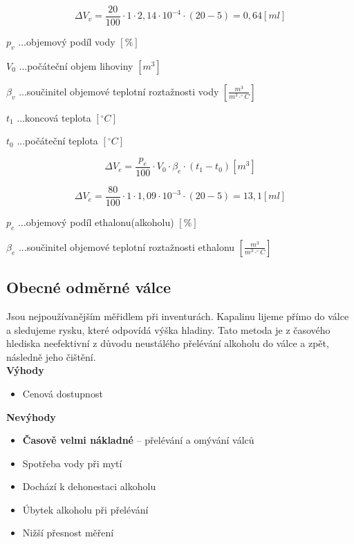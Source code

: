 \[\Delta V_v = \frac{20}{100} \cdot 1 \cdot  2,14 \cdot 10^{-4} \cdot (20 - 5) = 0,64 \left[ml\right]\]

\(p_v\) ...objemový podíl vody \([\%]\) 

\(V_0\) ...počáteční objem lihoviny \([m^3]\)

\(\beta_v\) ...součinitel objemové teplotní roztažnosti vody \([\frac{m^3}{m^3 \cdot ^\circ C}]\)

\(t_1\) ...koncová teplota \([^\circ C]\)

\(t_0\) ...počáteční teplota \([^\circ C]\)

\begin{equation}
    \Delta V_e = \frac{p_e}{100} \cdot V_0 \cdot \beta_e \cdot (t_1 - t_0)\left[m^3\right] \label{objem_kapalina}
\end{equation}

\[\Delta V_e = \frac{80}{100} \cdot 1 \cdot  1,09 \cdot 10^{-3} \cdot (20 - 5) = 13,1 \left[ml\right]\]

\(p_e\) ...objemový podíl ethalonu(alkoholu) \([\%]\) 

\(\beta_e\) ...součinitel objemové teplotní roztažnosti ethalonu \([\frac{m^3}{m^3 \cdot ^\circ C}]\)


\subsection{Obecné odměrné válce}
\label{obecny_valec}

Jsou nejpoužívanějším měřidlem při inventurách. Kapalinu lijeme přímo do válce a sledujeme rysku, které odpovídá výška hladiny. Tato metoda je z časového hlediska neefektivní z důvodu neustálého přelévání alkoholu do válce a zpět, následně jeho čištění.\\

\textbf{Výhody}
\begin{itemize}
    \item Cenová dostupnost\\
\end{itemize}

\textbf{Nevýhody}
\begin{itemize}
    \item \textbf{Časově velmi nákladné} – přelévání a omývání válců
    \item Spotřeba vody při mytí
    \item Dochází k dehonestaci alkoholu
    \item Úbytek alkoholu při přelévání
    \item Nižší přesnost měření\\\\\\\\\\\\\\\\\\
\end{itemize}

